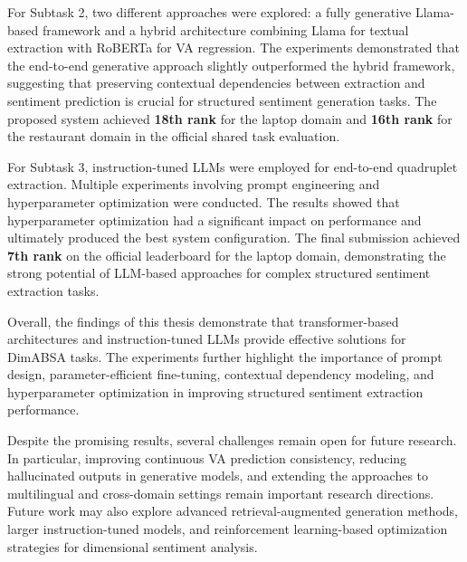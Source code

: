 \documentclass{article}
\begin{document}
For Subtask 2, two different approaches were explored: a fully generative Llama-based framework and a hybrid architecture combining Llama for textual extraction with RoBERTa for VA regression. The experiments demonstrated that the end-to-end generative approach slightly outperformed the hybrid framework, suggesting that preserving contextual dependencies between extraction and sentiment prediction is crucial for structured sentiment generation tasks. The proposed system achieved \textbf{18th rank} for the laptop domain and \textbf{16th rank} for the restaurant domain in the official shared task evaluation.

For Subtask 3, instruction-tuned LLMs were employed for end-to-end quadruplet extraction. Multiple experiments involving prompt engineering and hyperparameter optimization were conducted. The results showed that hyperparameter optimization had a significant impact on performance and ultimately produced the best system configuration. The final submission achieved \textbf{7th rank} on the official leaderboard for the laptop domain, demonstrating the strong potential of LLM-based approaches for complex structured sentiment extraction tasks.

Overall, the findings of this thesis demonstrate that transformer-based architectures and instruction-tuned LLMs provide effective solutions for DimABSA tasks. The experiments further highlight the importance of prompt design, parameter-efficient fine-tuning, contextual dependency modeling, and hyperparameter optimization in improving structured sentiment extraction performance.

Despite the promising results, several challenges remain open for future research. In particular, improving continuous VA prediction consistency, reducing hallucinated outputs in generative models, and extending the approaches to multilingual and cross-domain settings remain important research directions. Future work may also explore advanced retrieval-augmented generation methods, larger instruction-tuned models, and reinforcement learning-based optimization strategies for dimensional sentiment analysis.

 

\end{document}
